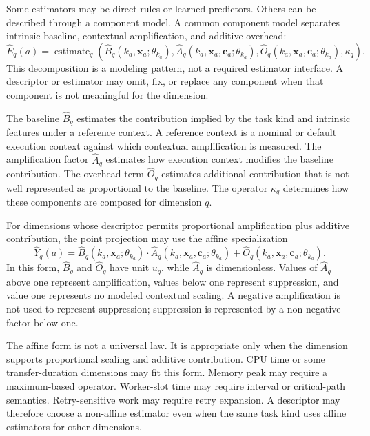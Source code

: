 Some estimators may be direct rules or learned predictors. Others can be
described through a component model. A common component model separates
intrinsic baseline, contextual amplification, and additive overhead:
\[
\widehat{E}_q(a)
=
\operatorname{estimate}_q\!\left(
\widehat{B}_q(k_a,\mathbf{x}_a;\theta_{k_a}),
\widehat{A}_q(k_a,\mathbf{x}_a,\mathbf{c}_a;\theta_{k_a}),
\widehat{O}_q(k_a,\mathbf{x}_a,\mathbf{c}_a;\theta_{k_a}),
\kappa_q
\right).
\]
This decomposition is a modeling pattern, not a required estimator interface.
A descriptor or estimator may omit, fix, or replace any component when that
component is not meaningful for the dimension.

The baseline $\widehat{B}_q$ estimates the contribution implied by the task
kind and intrinsic features under a reference context. A reference context is a
nominal or default execution context against which contextual amplification is
measured. The amplification factor $\widehat{A}_q$ estimates how execution
context modifies the baseline contribution. The overhead term $\widehat{O}_q$
estimates additional contribution that is not well represented as proportional
to the baseline. The operator $\kappa_q$ determines how these components are
composed for dimension $q$.

For dimensions whose descriptor permits proportional amplification plus additive
contribution, the point projection may use the affine specialization
\[
\widehat{Y}_q(a)
=
\widehat{B}_q(k_a,\mathbf{x}_a;\theta_{k_a})
\cdot
\widehat{A}_q(k_a,\mathbf{x}_a,\mathbf{c}_a;\theta_{k_a})
+
\widehat{O}_q(k_a,\mathbf{x}_a,\mathbf{c}_a;\theta_{k_a}).
\]
In this form, $\widehat{B}_q$ and $\widehat{O}_q$ have unit $u_q$, while
$\widehat{A}_q$ is dimensionless. Values of $\widehat{A}_q$ above one represent
amplification, values below one represent suppression, and value one represents
no modeled contextual scaling. A negative amplification is not used to represent
suppression; suppression is represented by a non-negative factor below one.

The affine form is not a universal law. It is appropriate only when the
dimension supports proportional scaling and additive contribution. CPU time or
some transfer-duration dimensions may fit this form. Memory peak may require a
maximum-based operator. Worker-slot time may require interval or critical-path
semantics. Retry-sensitive work may require retry expansion. A descriptor may
therefore choose a non-affine estimator even when the same task kind uses affine
estimators for other dimensions.

